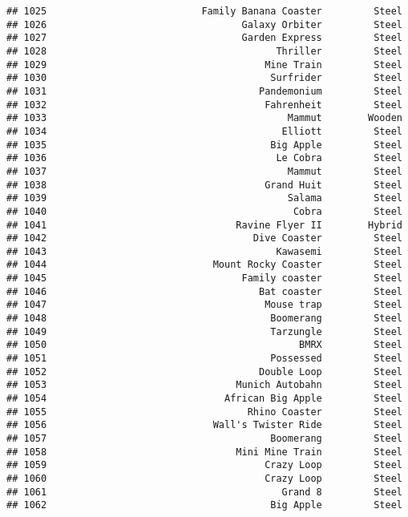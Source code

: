 \documentclass[
]{article}
\begin{document}
\begin{verbatim}
## 1025                           Family Banana Coaster         Steel
## 1026                                  Galaxy Orbiter         Steel
## 1027                                  Garden Express         Steel
## 1028                                        Thriller         Steel
## 1029                                      Mine Train         Steel
## 1030                                       Surfrider         Steel
## 1031                                     Pandemonium         Steel
## 1032                                      Fahrenheit         Steel
## 1033                                          Mammut        Wooden
## 1034                                         Elliott         Steel
## 1035                                       Big Apple         Steel
## 1036                                        Le Cobra         Steel
## 1037                                          Mammut         Steel
## 1038                                      Grand Huit         Steel
## 1039                                          Salama         Steel
## 1040                                           Cobra         Steel
## 1041                                 Ravine Flyer II        Hybrid
## 1042                                    Dive Coaster         Steel
## 1043                                        Kawasemi         Steel
## 1044                             Mount Rocky Coaster         Steel
## 1045                                  Family coaster         Steel
## 1046                                     Bat coaster         Steel
## 1047                                      Mouse trap         Steel
## 1048                                       Boomerang         Steel
## 1049                                       Tarzungle         Steel
## 1050                                            BMRX         Steel
## 1051                                       Possessed         Steel
## 1052                                     Double Loop         Steel
## 1053                                 Munich Autobahn         Steel
## 1054                               African Big Apple         Steel
## 1055                                   Rhino Coaster         Steel
## 1056                             Wall's Twister Ride         Steel
## 1057                                       Boomerang         Steel
## 1058                                 Mini Mine Train         Steel
## 1059                                      Crazy Loop         Steel
## 1060                                      Crazy Loop         Steel
## 1061                                         Grand 8         Steel
## 1062                                       Big Apple         Steel

\end{verbatim}
\end{document}
